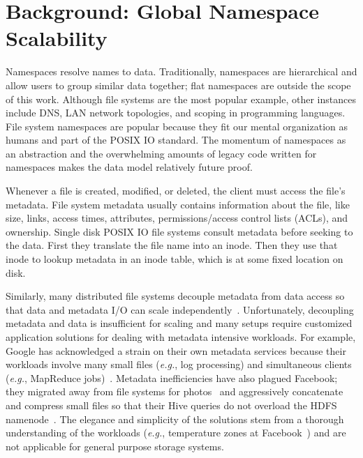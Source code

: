 \chapter{Background: Global Namespace Scalability}
\label{related-work}

Namespaces resolve names to data. Traditionally, namespaces are hierarchical
and allow users to group similar data together; flat namespaces are outside the
scope of this work. Although file systems are the most popular example, other
instances include DNS, LAN network topologies, and scoping in programming
languages.  File system namespaces are popular because they fit our mental
organization as humans and part of the POSIX IO standard. The momentum of
namespaces as an abstraction and the overwhelming amounts of legacy code
written for namespaces makes the data model relatively future proof.

Whenever a file is created, modified, or deleted, the client must access the
file's metadata. File system metadata usually contains information about the
file, like size, links, access times, attributes, permissions/access control
lists (ACLs), and ownership.  Single disk POSIX IO file systems consult
metadata before seeking to the data.  First they translate the file name into
an inode. Then they use that inode to lookup metadata in an inode table, which
is at some fixed location on disk.  

Similarly, many distributed file systems decouple metadata from data access so
that data and metadata I/O can scale
independently~\cite{alam:pdsw2011-metadata-scaling, ghemawat:sosp2003-gfs,
hildebrand:msst2005-pnfs, weil:osdi2006-ceph, welch:fast2008-panasas,
xing:sc2009-skyfs}.  Unfortunately, decoupling metadata and data is
insufficient for scaling and many setups require customized application
solutions for dealing with metadata intensive workloads. For example, Google
has acknowledged a strain on their own metadata services because their
workloads involve many small files ({\it e.g.}, log processing) and
simultaneous clients ({\it e.g.}, MapReduce
jobs)~\cite{mckusick:acm2010-gfs-evolution}. Metadata inefficiencies have also
plagued Facebook; they migrated away from file systems for
photos~\cite{beaver:osdi2010-haystack} and aggressively concatenate and
compress small files so that their Hive queries do not overload the HDFS
namenode~\cite{thusoo:sigmod2010-facebook-infrastructure}. The elegance and
simplicity of the solutions stem from a thorough understanding of the workloads
({\it e.g.}, temperature zones at Facebook~\cite{muralidhar:osdi2014-f4}) and
are not applicable for general purpose storage systems. 


